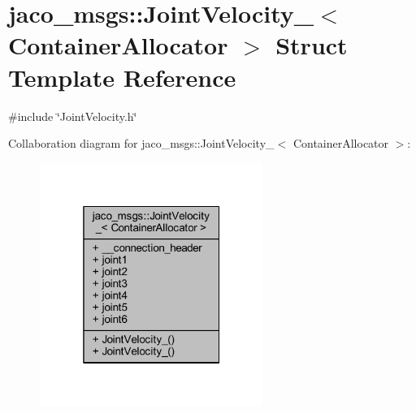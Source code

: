 \hypertarget{structjaco__msgs_1_1JointVelocity__}{}\section{jaco\+\_\+msgs\+:\+:Joint\+Velocity\+\_\+$<$ Container\+Allocator $>$ Struct Template Reference}
\label{structjaco__msgs_1_1JointVelocity__}


{\ttfamily \#include \char`\"{}Joint\+Velocity.\+h\char`\"{}}



Collaboration diagram for jaco\+\_\+msgs\+:\+:Joint\+Velocity\+\_\+$<$ Container\+Allocator $>$\+:
\nopagebreak
\begin{figure}[H]
\begin{center}
\leavevmode
\includegraphics[width=205pt]{d1/d02/structjaco__msgs_1_1JointVelocity____coll__graph}
\end{center}
\end{figure}
